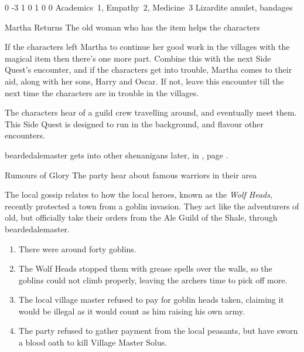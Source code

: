 \begin{multicols}{2}
  {0}%
  {-3}%
  {{1}%
  {0}%
  {1}}%
  {0}%
  {0}%
  {Academics~1, Empathy~2, Medicine~3}%
  {Lizardite amulet, bandages}%
  {}

{\squash Martha Returns}%
{The old woman who has the item helps the characters}%

If the characters left Martha to continue her good work in the villages with the magical item then there's one more part.
Combine this with the next Side Quest's encounter, and if the characters get into trouble, Martha comes to their aid, along with her sons, Harry and Oscar.
If not, leave this encounter till the next time the characters are in trouble in the villages.


\stopcontents[sq]

\startcontents[Forest]
\resumecontents[Villages]
\stopcontents[Forest]
\stopcontents[Villages]

\startcontents[sq]

\sqminitoc

\noindent
The characters hear of a guild crew travelling around, and eventually meet them.
This Side Quest is designed to run in the background, and flavour other encounters.

\Gls{beardedalemaster} gets into other shenanigans later, in , page \pageref{troubleAle}.

{\N \squash Rumours of Glory}%
{The party hear about famous warriors in their area}%

The local gossip relates to how the local heroes, known as the \textit{Wolf Heads}, recently protected a town from a goblin invasion.
They act like the adventurers of old, but officially take their orders from the Ale Guild of the Shale, through \gls{beardedalemaster}.

\begin{enumerate}
  \item{There were around forty goblins.}
  \item{The Wolf Heads stopped them with grease spells over the walls, so the goblins could not climb properly, leaving the archers time to pick off more.}
  \item{The local village master refused to pay for goblin heads taken, claiming it would be illegal as it would count as him raising his own army.}
  \item{The party refused to gather payment from the local peasants, but have sworn a blood oath to kill Village Master Solus.}
\end{enumerate}


\end{multicols}
